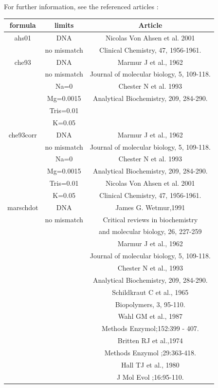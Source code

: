 \documentclass{article}
\begin{document}
For further information, see the referenced articles :
\begin{table}[h][c]
\begin{tabular}[h]{| c | c | c |}
\textbf{formula} & \textbf{limits} & \textbf{Article} \\ 
\hline
ahs01 & DNA & Nicolas Von Ahsen et al. 2001\\
 & no mismatch & Clinical Chemistry, 47, 1956-1961. \\
 \hline
che93 & DNA & Marmur J et al., 1962\\
 & no mismatch & Journal of molecular biology, 5, 109-118. \\
 & Na=0 & Chester N et al. 1993\\
 & Mg=0.0015 & Analytical Biochemistry, 209, 284-290. \\
 & Tris=0.01 & \\ 
 & K=0.05 & \\
 \hline
che93corr & DNA & Marmur J et al., 1962\\
 & no mismatch & Journal of molecular biology, 5, 109-118. \\
 & Na=0 & Chester N et al. 1993\\
 & Mg=0.0015 & Analytical Biochemistry, 209, 284-290. \\
 & Tris=0.01 & Nicolas Von Ahsen et al. 2001\\
 & K=0.05 & Clinical Chemistry, 47, 1956-1961. \\
 \hline
marschdot & DNA & James G. Wetmur,1991\\
 & no mismatch & Critical reviews in biochemistry \\
 & & and molecular biology, 26, 227-259 \\
 & & Marmur J et al., 1962\\
 & & Journal of molecular biology, 5, 109-118. \\
 & & Chester N et al., 1993\\
 & & Analytical Biochemistry, 209, 284-290. \\
 & & Schildkraut C et al., 1965\\
 & & Biopolymers, 3, 95-110. \\
 & & Wahl GM et al., 1987\\
 & & Methods Enzymol;152:399 - 407. \\
 & & Britten RJ et al.,1974\\
 & & Methods Enzymol ;29:363-418. \\
 & & Hall TJ et al., 1980\\
 & & J Mol Evol ;16:95-110.\\

\end{tabular}
\end{table}
\end{document}
